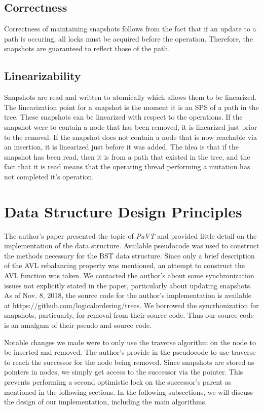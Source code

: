 \documentclass[conference]{IEEEtran}
\theoremstyle{definition}
\theoremstyle{theorem}
\begin{document}
\subsection{Correctness}
Correctness of maintaining snapshots follows from the fact that if an update to a path is occuring, all locks must be acquired before the operation. Therefore, the snapshots are guaranteed to reflect those of the path. 
\subsection{Linearizability}
Snapshots are read and written to atomically which allows them to be linearized. The linearization point for a snapshot is the moment it is an SPS of a path in the tree. These snapshots can be linearized with respect to the operations. If the snapshot were to contain a node that has been removed, it is linearized just prior to the removal. If the snapshot does not contain a node that is now reachable via an insertion, it is linearized just before it was added. The idea is that if the snapshot has been read, then it is from a path that existed in the tree, and the fact that it is read means that the operating thread performing a mutation has not completed it's operation. 
\section{Data Structure Design Principles}

The author's paper presented the topic of \textit{PaVT} and provided little detail on the implementation of the data structure. Available pseudocode was used to construct the methods necessary for the BST data structure. Since only a brief description of the AVL rebalancing property was mentioned, an attempt to construct the AVL function was taken. We contacted the author's about some synchronization issues not explicitly stated in the paper, particularly about updating snapshots. As of Nov. 8, 2018, the source code for the author's implementation is available at {https://github.com/logicalordering/trees}. We borrowed the syncrhonization for snapshots, particuarly, for removal from their source code. Thus our source code is an amalgam of their pseudo and source code. 

Notable changes we made were to only use the traverse algorithm on the node to be inserted and removed. The author's provide in the pseudocode to use traverse to reach the successor for the node being removed. Since snapshots are stored as pointers in nodes, we simply get access to the successor via the pointer. This prevents performing a second optimistic lock on the successor's parent as mentioned in the following sections. In the following subsections, we will discuss the design of our implementation, including the main algorithms.
\end{document}
